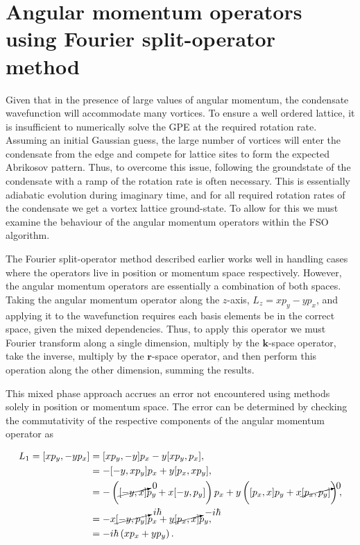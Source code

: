 \section{Angular momentum operators using Fourier split-operator method}

Given that in the presence of large values of angular momentum, the condensate wavefunction will accommodate many vortices. To ensure a well ordered lattice, it is insufficient to numerically solve the GPE at the required rotation rate. Assuming an initial Gaussian guess, the large number of vortices will enter the condensate from the edge and compete for lattice sites to form the expected Abrikosov pattern. Thus, to overcome this issue, following the groundstate of the condensate with a ramp of the rotation rate is often necessary. This is essentially adiabatic evolution during imaginary time, and for all required rotation rates of the condensate we get a vortex lattice ground-state. To allow for this we must examine the behaviour of the angular momentum operators within the FSO algorithm.

The Fourier split-operator method described earlier works well in handling cases where the operators live in position or momentum space respectively. However, the angular momentum operators are essentially a combination of both spaces. Taking the angular momentum operator along the $z$-axis, $L_z = xp_y - yp_x$, and applying it to the wavefunction requires each basis elements be in the correct space, given the mixed dependencies. Thus, to apply this operator we must Fourier transform along a single dimension, multiply by the $\mathbf{k}$-space operator, take the inverse, multiply by the $\mathbf{r}$-space operator, and then perform this operation along the other dimension, summing the results.

 This mixed phase approach accrues an error not encountered using methods solely in position or momentum space. The error can be determined by checking the commutativity of the respective components of the angular momentum operator as

 \begin{subequations}
 \begin{align}
 	L_1 = [x p_y,-y p_x] &= [x p_y,-y] p_x  -  y[x p_y,p_x], \\
 				   &= -[-y,x p_y] p_x + y [p_x, x p_y], \\
 				   &= -\left( {\cancelto{0}{[-y,x]}} p_y + x [-y,p_y] \right) p_x + y \left( [p_x,x] p_y + x {\cancelto{0}{[p_x,p_y]}} \right), \\
 				   &= -x {\cancelto{i\hbar}{[-y, p_y]}} p_x + y {\cancelto{-i\hbar}{[p_x,x]}} p_y, \\
 				   &= -i\hbar \left(x p_x + y p_y \right).
 \end{align}
\end{subequations}

